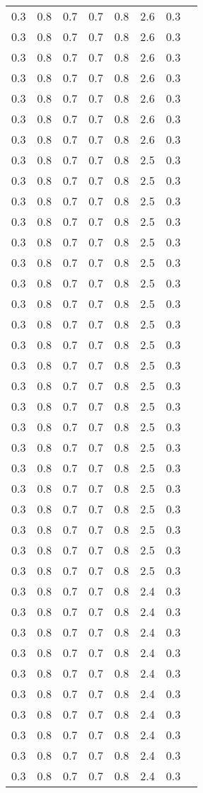 \begin{tabular}{L{1in}|L{1in}|L{1in}|L{1in}|L{1in}|L{1in}|L{1in}|L{1in}}
0.3&0.8&0.7&0.7&0.8&2.6&0.3\\
0.3&0.8&0.7&0.7&0.8&2.6&0.3\\
0.3&0.8&0.7&0.7&0.8&2.6&0.3\\
0.3&0.8&0.7&0.7&0.8&2.6&0.3\\
0.3&0.8&0.7&0.7&0.8&2.6&0.3\\
0.3&0.8&0.7&0.7&0.8&2.6&0.3\\
0.3&0.8&0.7&0.7&0.8&2.6&0.3\\
0.3&0.8&0.7&0.7&0.8&2.5&0.3\\
0.3&0.8&0.7&0.7&0.8&2.5&0.3\\
0.3&0.8&0.7&0.7&0.8&2.5&0.3\\
0.3&0.8&0.7&0.7&0.8&2.5&0.3\\
0.3&0.8&0.7&0.7&0.8&2.5&0.3\\
0.3&0.8&0.7&0.7&0.8&2.5&0.3\\
0.3&0.8&0.7&0.7&0.8&2.5&0.3\\
0.3&0.8&0.7&0.7&0.8&2.5&0.3\\
0.3&0.8&0.7&0.7&0.8&2.5&0.3\\
0.3&0.8&0.7&0.7&0.8&2.5&0.3\\
0.3&0.8&0.7&0.7&0.8&2.5&0.3\\
0.3&0.8&0.7&0.7&0.8&2.5&0.3\\
0.3&0.8&0.7&0.7&0.8&2.5&0.3\\
0.3&0.8&0.7&0.7&0.8&2.5&0.3\\
0.3&0.8&0.7&0.7&0.8&2.5&0.3\\
0.3&0.8&0.7&0.7&0.8&2.5&0.3\\
0.3&0.8&0.7&0.7&0.8&2.5&0.3\\
0.3&0.8&0.7&0.7&0.8&2.5&0.3\\
0.3&0.8&0.7&0.7&0.8&2.5&0.3\\
0.3&0.8&0.7&0.7&0.8&2.5&0.3\\
0.3&0.8&0.7&0.7&0.8&2.5&0.3\\
0.3&0.8&0.7&0.7&0.8&2.4&0.3\\
0.3&0.8&0.7&0.7&0.8&2.4&0.3\\
0.3&0.8&0.7&0.7&0.8&2.4&0.3\\
0.3&0.8&0.7&0.7&0.8&2.4&0.3\\
0.3&0.8&0.7&0.7&0.8&2.4&0.3\\
0.3&0.8&0.7&0.7&0.8&2.4&0.3\\
0.3&0.8&0.7&0.7&0.8&2.4&0.3\\
0.3&0.8&0.7&0.7&0.8&2.4&0.3\\
0.3&0.8&0.7&0.7&0.8&2.4&0.3\\
0.3&0.8&0.7&0.7&0.8&2.4&0.3\\

\end{tabular}

